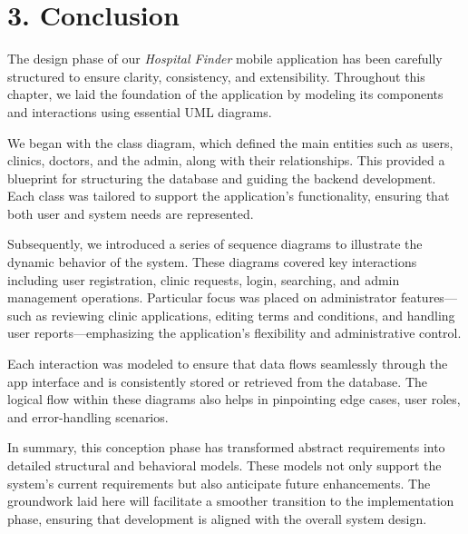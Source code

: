 \documentclass[12pt]{report}
\begin{document}
\section*{3. Conclusion}

\vspace{1em}

\noindent
The design phase of our \textit{Hospital Finder} mobile application has been carefully structured to ensure clarity, consistency, and extensibility. Throughout this chapter, we laid the foundation of the application by modeling its components and interactions using essential UML diagrams.

\vspace{1em}

\noindent
We began with the class diagram, which defined the main entities such as users, clinics, doctors, and the admin, along with their relationships. This provided a blueprint for structuring the database and guiding the backend development. Each class was tailored to support the application's functionality, ensuring that both user and system needs are represented.

\vspace{1em}

\noindent
Subsequently, we introduced a series of sequence diagrams to illustrate the dynamic behavior of the system. These diagrams covered key interactions including user registration, clinic requests, login, searching, and admin management operations. Particular focus was placed on administrator features—such as reviewing clinic applications, editing terms and conditions, and handling user reports—emphasizing the application's flexibility and administrative control.

\vspace{1em}

\noindent
Each interaction was modeled to ensure that data flows seamlessly through the app interface and is consistently stored or retrieved from the database. The logical flow within these diagrams also helps in pinpointing edge cases, user roles, and error-handling scenarios.

\vspace{1em}

\noindent
In summary, this conception phase has transformed abstract requirements into detailed structural and behavioral models. These models not only support the system’s current requirements but also anticipate future enhancements. The groundwork laid here will facilitate a smoother transition to the implementation phase, ensuring that development is aligned with the overall system design.
\end{document}
